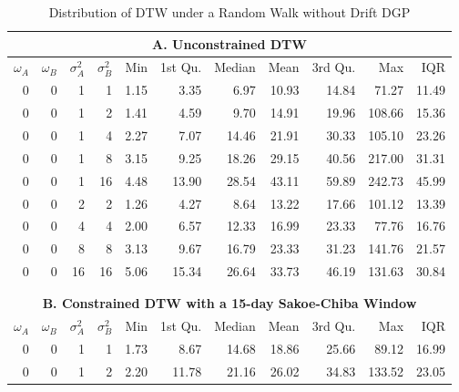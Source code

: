\begin{table}[!ht]
    \centering
    \fontsize{10pt}{10pt}\selectfont
    \begin{threeparttable}
        \caption{Distribution of DTW under a Random Walk without Drift DGP} \label{tbl:dtw_random_walk_no_drift}
        \begin{tabular}{r r r r | r r r r r r r}
            \multicolumn{11}{c}{\textbf{A. Unconstrained DTW}} \\
            \midrule
            $\omega_{A}$ & $\omega_{B}$ & $\sigma^{2}_{A}$ & $\sigma^{2}_{B}$ & Min & 1st Qu. & Median & Mean & 3rd Qu. & Max & IQR \\
            \midrule
            0 & 0 & 1  & 1  & 1.15 &  3.35 &  6.97 & 10.93 & 14.84 &  71.27 & 11.49  \\
            \midrule
            0 & 0 & 1  & 2  & 1.41 &  4.59 &  9.70 & 14.91 & 19.96 & 108.66 & 15.36  \\
            0 & 0 & 1  & 4  & 2.27 &  7.07 & 14.46 & 21.91 & 30.33 & 105.10 & 23.26  \\
            0 & 0 & 1  & 8  & 3.15 &  9.25 & 18.26 & 29.15 & 40.56 & 217.00 & 31.31  \\
            0 & 0 & 1  & 16 & 4.48 & 13.90 & 28.54 & 43.11 & 59.89 & 242.73 & 45.99  \\
            \midrule
            0 & 0 & 2  & 2  & 1.26 &  4.27 &  8.64 & 13.22 & 17.66 & 101.12 & 13.39  \\
            0 & 0 & 4  & 4  & 2.00 &  6.57 & 12.33 & 16.99 & 23.33 &  77.76 & 16.76  \\
            0 & 0 & 8  & 8  & 3.13 &  9.67 & 16.79 & 23.33 & 31.23 & 141.76 & 21.57  \\
            0 & 0 & 16 & 16 & 5.06 & 15.34 & 26.64 & 33.73 & 46.19 & 131.63 & 30.84  \\
            \hline
            \\
            \\
            \multicolumn{11}{c}{\textbf{B. Constrained DTW with a 15-day Sakoe-Chiba Window}} \\
            \midrule
            $\omega_{A}$ & $\omega_{B}$ & $\sigma^{2}_{A}$ & $\sigma^{2}_{B}$ & Min & 1st Qu. & Median & Mean & 3rd Qu. & Max & IQR \\
            \midrule
            0 & 0 & 1  & 1  & 1.73 & 8.67 & 14.68 & 18.86 &  25.66 &  89.12 & 16.99  \\
            \midrule
            0 & 0 & 1  & 2  & 2.20 & 11.78 & 21.16 & 26.02 &  34.83 & 133.52 & 23.05  \\

\end{tabular}
\end{threeparttable}
\end{table}
